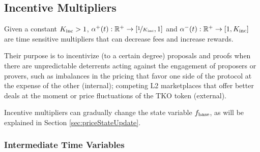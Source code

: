 \documentclass[9pt,oneside]{amsart}
\begin{document}
\begin{multicols}{2}


\subsection{Incentive Multipliers}
\label{sec:incentive_mult}
Given a constant $K_\textnormal{inc} > 1$, 
$\alpha^+(t): \mathbb{R}^+\rightarrow [ \nicefrac{1}{K_\textnormal{inc}},1]$ and $\alpha^-(t): \mathbb{R}^+\rightarrow [1, K_\textnormal{inc}] $ are time sensitive multipliers that can decrease fees and increase rewards. 

Their purpose is to incentivize (to a certain degree) proposals and proofs when there are unpredictable deterrents acting against the engagement of proposers or provers, such as imbalances in the pricing that favor one side of the protocol at the expense of the other (internal);  competing L2 marketplaces that offer better deals at the moment or price fluctuations of the TKO token (external).

Incentive multipliers can gradually change the state variable $f_\textnormal{base}$, as will be explained in Section \ref{sec:priceStateUpdate}.

\subsubsection{Intermediate Time Variables} 
\label{sec:intermediateTimeVar}


\end{multicols}
\end{document}
